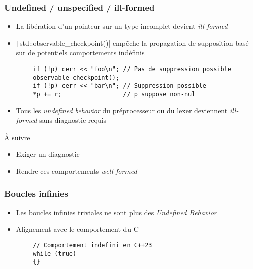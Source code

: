 \documentclass[C++.tex]{subfiles}
\begin{document}
\begin{frame}[fragile]
	\frametitle{Undefined / unspecified / ill-formed}
	\begin{itemize}
		\item La libération d'un pointeur sur un type incomplet devient \textit{ill-formed}


		\item \texttt|std::observable_checkpoint()| empêche la propagation de supposition basé sur de potentiels comportements indéfinis
	\end{itemize}

	\begin{verbatim}
		if (!p) cerr << "foo\n"; // Pas de suppression possible
		observable_checkpoint();
		if (!p) cerr << "bar\n"; // Suppression possible
		*p += r;                 // p suppose non-nul
	\end{verbatim}

	\begin{itemize}
		\item Tous les \textit{undefined behavior} du préprocesseur ou du lexer deviennent \textit{ill-formed} sans diagnostic requis
	\end{itemize}

	\begin{block}{À suivre}
		\begin{itemize}
			\item Exiger un diagnostic
			\item Rendre ces comportements \textit{well-formed}
		\end{itemize}
	\end{block}

\end{frame}

\begin{frame}[fragile]
	\frametitle{Boucles infinies}
	\begin{itemize}
		\item Les boucles infinies triviales ne sont plus des \textit{Undefined Behavior}
		\item Alignement avec le comportement du C
	\end{itemize}

	\begin{verbatim}
		// Comportement indefini en C++23
		while (true)
		{}
	\end{verbatim}

\end{frame}
\end{document}
